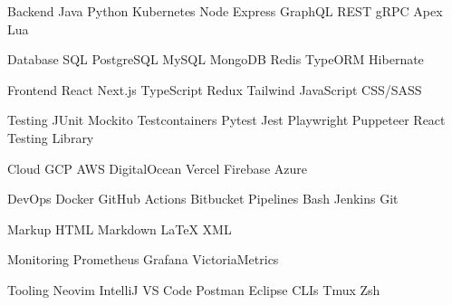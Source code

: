 

\begin{cvskills}

  \cvskill
    {Backend} %
    {Java \cpshalf Python \cpshalf Kubernetes \cpshalf Node \cpshalf Express \cpshalf GraphQL \cpshalf REST \cpshalf gRPC \cpshalf Apex \cpshalf Lua } %

  \cvskill
    {Database} %
    {SQL \cpshalf PostgreSQL \cpshalf MySQL \cpshalf MongoDB \cpshalf Redis \cpshalf TypeORM \cpshalf Hibernate} %

  \cvskill
    {Frontend} %
    {React \cpshalf Next.js \cpshalf TypeScript \cpshalf Redux \cpshalf Tailwind \cpshalf JavaScript \cpshalf CSS/SASS} %

  \cvskill
    {Testing} %
    {JUnit \cpshalf Mockito \cpshalf Testcontainers \cpshalf Pytest \cpshalf Jest \cpshalf Playwright \cpshalf Puppeteer \cpshalf React Testing Library} %

  \cvskill
    {Cloud} %
    {GCP \cpshalf AWS \cpshalf DigitalOcean \cpshalf Vercel \cpshalf Firebase \cpshalf Azure} %

  \cvskill
    {DevOps} %
    {Docker \cpshalf GitHub Actions \cpshalf Bitbucket Pipelines \cpshalf Bash \cpshalf Jenkins \cpshalf Git} %

  \cvskill
    {Markup} %
    {HTML \cpshalf Markdown \cpshalf LaTeX \cpshalf XML} %

  \cvskill
  {Monitoring} %
    {Prometheus \cpshalf Grafana \cpshalf VictoriaMetrics} %

  \cvskill
  {Tooling} %
    {Neovim \cpshalf IntelliJ \cpshalf VS Code \cpshalf Postman \cpshalf Eclipse \cpshalf CLIs \cpshalf Tmux \cpshalf Zsh} %

\end{cvskills}
